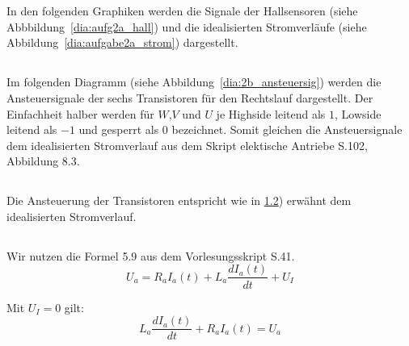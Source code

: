 %
%
%
%
\chapter{}\label{ex:aufg2}
%
%
\section{}\label{sec:aufg2a}
%
In den folgenden Graphiken werden die Signale der Hallsensoren (siehe Abbbildung~\ref{dia:aufg2a_hall}) und die idealisierten Stromverläufe (siehe Abbildung~\ref{dia:aufgabe2a_strom}) dargestellt.


\newpage
%
%
%
\section{}\label{sec:aufg2b}
%
Im folgenden Diagramm (siehe Abbildung~\ref{dia:2b_ansteuersig}) werden die Ansteuersignale der sechs Transistoren für den Rechtslauf dargestellt. Der Einfachheit halber werden für $W$,$V$ und $U$ je Highside leitend als $1$, Lowside leitend als $-1$ und gesperrt als $0$ bezeichnet. Somit gleichen die Ansteuersignale dem idealisierten Stromverlauf aus dem Skript elektische Antriebe S.102, Abbildung 8.3.

%
\section{}\label{sec:aufg2c}
%
Die Ansteuerung der Transistoren entspricht wie in \ref{sec:aufg2b}) erwähnt  dem idealisierten Stromverlauf.

%
\newpage
\section{}\label{sec:aufg2d}
%
Wir nutzen die Formel 5.9 aus dem Vorlesungsskript S.41.
\begin{equation}
	U_a = R_a I_a(t) + L_a \frac{dI_a(t)}{dt} + U_I
	\label{for:formel1}
\end{equation}

Mit $U_I = 0$ gilt:
\begin{equation}
    L_a\frac{dI_a(t)}{dt} + R_a I_a(t) = U_a
	\label{for:formel2}
\end{equation}

